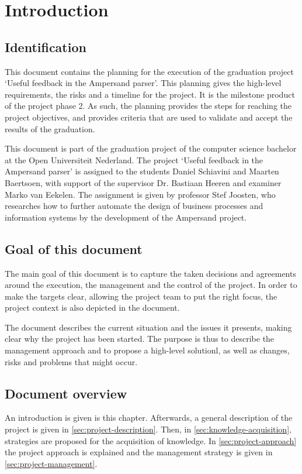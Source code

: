 \section{Introduction}
\subsection{Identification}
%
This document contains the planning for the execution of the graduation project `Useful feedback in the Ampersand parser'.
This planning gives the high-level requirements, the risks and a timeline for the project.
It is the milestone product of the project phase 2.
As such, the planning provides the steps for reaching the project objectives, and provides criteria that are used to validate and accept the results of the graduation.

This document is part of the graduation project of the computer science bachelor at the Open Universiteit Nederland.
The project `Useful feedback in the Ampersand parser' is assigned to the students Daniel Schiavini and Maarten Baertsoen, with support of the supervisor Dr. Bastiaan Heeren and examiner Marko van Eekelen.
The assignment is given by professor Stef Joosten, who researches how to further automate the design of business processes and information systems by the development of the Ampersand project.

\subsection{Goal of this document}
The main goal of this document is to capture the taken decisions and agreements around the execution, the management and the control of the project.
In order to make the targets clear, allowing the project team to put the right focus, the project context is also depicted in the document.

The document describes the current situation and the issues it presents, making clear why the project has been started.
The purpose is thus to describe the management approach and to propose a high-level solutionl, as well as changes, risks and problems that might occur.

\subsection{Document overview}
An introduction is given is this chapter.
Afterwards, a general description of the project is given in \autoref{sec:project-description}.
Then, in \autoref{sec:knowledge-acquisition}, strategies are proposed for the acquisition of knowledge.
In \autoref{sec:project-approach} the project approach is explained and the management strategy is given in \autoref{sec:project-management}.

